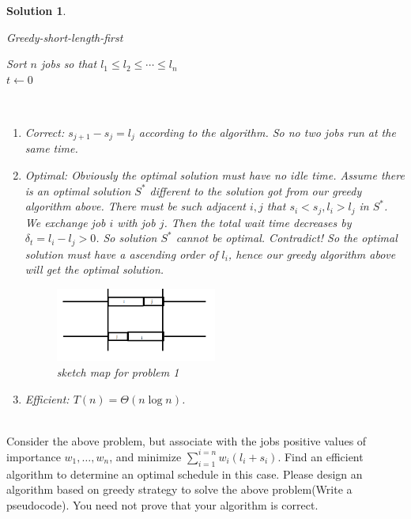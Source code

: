 \documentclass{article}
\newtheorem*{solution}{Solution}
\begin{document}
\begin{enumerate}
\begin{solution}
\begin{minipage}[t]{0.8\textwidth}
\begin{algorithm}[H]
            \BlankLine
            \caption{Greedy-short-length-first}\label{Alg-greedy1}
            Sort $n$ jobs so that $l_1\leq l_2\leq \cdots \leq l_n$\\
            $t \leftarrow 0$\\
        \end{algorithm}
        \end{minipage}\\
    \begin{enumerate}
        \item Correct: $s_{j+1}-s_{j} = l_j$ according to the algorithm. So no two jobs run at the same time.
        \item Optimal: Obviously the optimal solution must have no idle time. Assume there is an optimal solution $S^*$ different to the solution got from our greedy algorithm above. There must be such adjacent $i, j$ that $s_i < s_j, l_i > l_j$ in $S^*$.
            We exchange job $i$ with job $j$. Then the total wait time decreases by $\delta_t=l_i-l_j>0$. So solution $S^*$ cannot be optimal. Contradict! So the optimal solution must have a ascending order of $l_i$, hence our greedy algorithm above will get the optimal solution.
            \begin{figure}[!h]
                \centering
                \caption{sketch map for problem 1}
                \includegraphics[width=0.5\textwidth]{example1.png}
            \end{figure}
        \item Efficient: $T(n)=\Theta(n\log n)$.
    \end{enumerate}
\end{solution}
~\\


Consider the above problem, but associate with the jobs positive values of importance $w_1,…,w_n$, and minimize $\sum_{i=1}^{i=n} w_i(l_i+s_i)$. Find an efficient algorithm to determine an optimal schedule in this case. Please design an algorithm based on greedy strategy to solve the above problem(Write a pseudocode). You need not prove that your algorithm is correct.


\end{enumerate}
\end{document}
